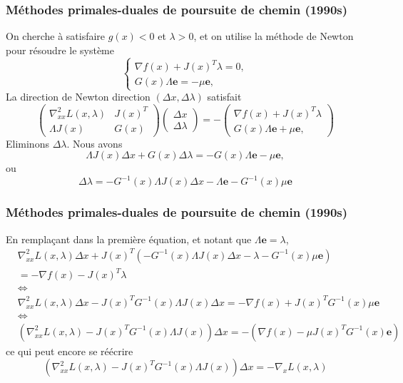 \documentclass[usepdftitle=false,aspectratio=169]{beamer}
\def\be{\boldsymbol{e}}
\begin{document}
\begin{frame}
\frametitle{Méthodes primales-duales de poursuite de chemin (1990s)}

On cherche à satisfaire $g(x) < 0$ et $\lambda > 0$, et on utilise la méthode de Newton pour résoudre le système
$$
\begin{cases}
\nabla f(x) + J(x)^T\lambda = 0, \\
G(x)\Lambda\be = -\mu\be,
\end{cases}
$$
La direction de Newton direction $(\Delta x, \Delta \lambda)$ satisfait
$$
\begin{pmatrix}
\nabla^2_{xx} L(x, \lambda) &  J(x)^T \\
\Lambda J(x) & G(x)
\end{pmatrix}
\begin{pmatrix}
\Delta x \\ \Delta \lambda
\end{pmatrix}
= -
\begin{pmatrix}
\nabla f(x) + J(x)^T\lambda \\
G(x)\Lambda\be + \mu\be,
\end{pmatrix}
$$
Eliminons $\Delta \lambda$. Nous avons
$$
\Lambda J(x) \Delta x + G(x) \Delta \lambda
= - G(x)\Lambda\be - \mu\be,
$$
ou
$$
\Delta \lambda = - G^{-1}(x) \Lambda J(x) \Delta x - \Lambda\be - G^{-1}(x) \mu\be
$$

\end{frame}

\begin{frame}
\frametitle{Méthodes primales-duales de poursuite de chemin (1990s)}

En remplaçant dans la première équation, et notant que $\Lambda \be = \lambda$,
\begin{align*}
& \nabla^2_{xx} L(x, \lambda) \Delta x + J(x)^T (- G^{-1}(x) \Lambda J(x) \Delta x - \lambda - G^{-1}(x) \mu\be) \\
&=  - \nabla f(x) - J(x)^T\lambda \\
&\Leftrightarrow \\
& \nabla^2_{xx} L(x, \lambda) \Delta x - J(x)^TG^{-1}(x) \Lambda J(x) \Delta x =  - \nabla f(x) + J(x)^TG^{-1}(x) \mu\be \\
&\Leftrightarrow \\
& ( \nabla^2_{xx} L(x, \lambda) - J(x)^TG^{-1}(x) \Lambda J(x)) \Delta x =  - (\nabla f(x) - \mu J(x)^TG^{-1}(x)\be)
\end{align*}
ce qui peut encore se réécrire
$$
( \nabla^2_{xx} L(x, \lambda) - J(x)^TG^{-1}(x) \Lambda J(x)) \Delta x =  -\nabla_x L(x,\lambda)
$$

\end{frame}
\end{document}
